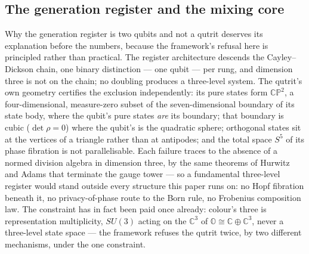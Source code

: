 \subsection{The generation register and the mixing core}
\label{app:hw-ckm}

Why the generation register is two qubits and not a qutrit deserves its explanation before the
numbers, because the framework's refusal here is principled rather than practical. The register
architecture descends the Cayley--Dickson chain, one binary distinction --- one qubit --- per
rung, and dimension three is not on the chain; no doubling produces a three-level system. The
qutrit's own geometry certifies the exclusion independently: its pure states form
$\mathbb{CP}^{2}$, a four-dimensional, measure-zero subset of the seven-dimensional boundary of
its state body, where the qubit's pure states \emph{are} its boundary; that boundary is cubic
($\det\rho = 0$) where the qubit's is the quadratic sphere; orthogonal states sit at the vertices
of a triangle rather than at antipodes; and the total space $S^{5}$ of its phase fibration is not
parallelisable. Each failure traces to the absence of a normed division algebra in dimension
three, by the same theorems of Hurwitz and Adams that terminate the gauge tower --- so a
fundamental three-level register would stand outside every structure this paper runs on: no Hopf
fibration beneath it, no privacy-of-phase route to the Born rule, no Frobenius composition law.
The constraint has in fact been paid once already: colour's three is representation multiplicity,
$SU(3)$ acting on the $\mathbb{C}^{3}$ of $\mathbb{O} \cong \mathbb{C} \oplus \mathbb{C}^{3}$,
never a three-level state space --- the framework refuses the qutrit twice, by two different
mechanisms, under the one constraint.

